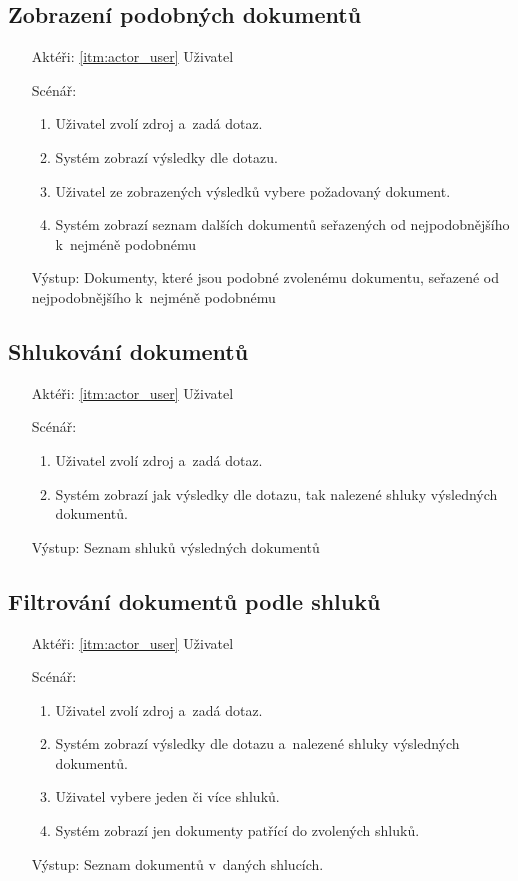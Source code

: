 \subsection{Zobrazení podobných dokumentů}
\begin{itemize}
	\item[Aktéři:] \ref{itm:actor_user} Uživatel
	\item[Scénář:]
	\begin{enumerate}
		\item Uživatel zvolí zdroj a~zadá dotaz.
		\item Systém zobrazí výsledky dle dotazu.
		\item Uživatel ze zobrazených výsledků vybere požadovaný dokument.
		\item Systém zobrazí seznam dalších dokumentů seřazených od nejpodobnějšího k~nejméně podobnému
	\end{enumerate}
	\item[Výstup:] Dokumenty, které jsou podobné zvolenému dokumentu, seřazené od nejpodobnějšího k~nejméně podobnému
\end{itemize}

\subsection{Shlukování dokumentů}
\begin{itemize}
	\item[Aktéři:] \ref{itm:actor_user} Uživatel
	\item[Scénář:]
	\begin{enumerate}
		\item Uživatel zvolí zdroj a~zadá dotaz.
		\item Systém zobrazí jak výsledky dle dotazu, tak nalezené shluky výsledných dokumentů.
	\end{enumerate}
	\item[Výstup:] Seznam shluků výsledných dokumentů
\end{itemize}

\subsection{Filtrování dokumentů podle shluků}
\begin{itemize}
	\item[Aktéři:] \ref{itm:actor_user} Uživatel
	\item[Scénář:]
	\begin{enumerate}
		\item Uživatel zvolí zdroj a~zadá dotaz.
		\item Systém zobrazí výsledky dle dotazu a~nalezené shluky výsledných dokumentů.
		\item Uživatel vybere jeden či více shluků.
		\item Systém zobrazí jen dokumenty patřící do zvolených shluků.
	\end{enumerate}
	\item[Výstup:] Seznam dokumentů v~daných shlucích.
\end{itemize}


